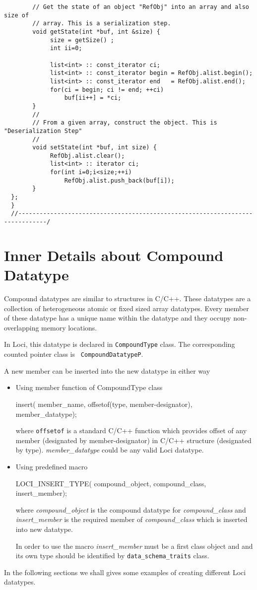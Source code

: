 \begin{verbatim}
        // Get the state of an object "RefObj" into an array and also size of
        // array. This is a serialization step. 
        void getState(int *buf, int &size) {
             size = getSize() ;
             int ii=0;

             list<int> :: const_iterator ci;
             list<int> :: const_iterator begin = RefObj.alist.begin();
             list<int> :: const_iterator end   = RefObj.alist.end();
             for(ci = begin; ci != end; ++ci) 
                 buf[ii++] = *ci;
        }
        //
        // From a given array, construct the object. This is "Deserialization Step"
        //
        void setState(int *buf, int size) {
             RefObj.alist.clear();
             list<int> :: iterator ci;
             for(int i=0;i<size;++i)
                 RefObj.alist.push_back(buf[i]);
        }
  };
  }
  //------------------------------------------------------------------------------/
\end{verbatim}
%
%
\section{Inner Details about Compound Datatype}
Compound datatypes are similar to structures in C/C++. These datatypes
are a collection of heterogeneous atomic or fixed sized array datatypes. 
Every member of these datatype has a unique name within the datatype and 
they occupy  non-overlapping memory locations.
%
%
\par In Loci, this datatype is declared in {\tt CompoundType}
class. The corresponding counted pointer class is {\tt
CompoundDatatypeP}.
%
\par A new member can be inserted into the new datatype in either way
\begin{itemize}
\item Using member function of CompoundType class
\begin{center}
insert( member\_name, offsetof(type, member-designator), member\_datatype);
\end{center}
where {\tt offsetof} is a standard C/C++ function which provides offset of any
member (designated by member-designator) in C/C++ structure (designated by type).
{\em member\_datatype} could be any valid Loci datatype.
%
\item Using predefined macro
\begin{center}
LOCI\_INSERT\_TYPE( compound\_object, compound\_class, insert\_member);
\end{center}
\par where {\em compound\_object} is the compound datatype for {\em compound\_class}
and {\em insert\_member} is the required member of {\em compound\_class} which
is inserted into new datatype. 
\par In order to use the macro {\em insert\_member} must be a first class object
and and its own type should be identified by {\tt data\_schema\_traits} class.
\end{itemize}
\par In the following sections we shall gives some examples of
creating different Loci datatypes.
%
